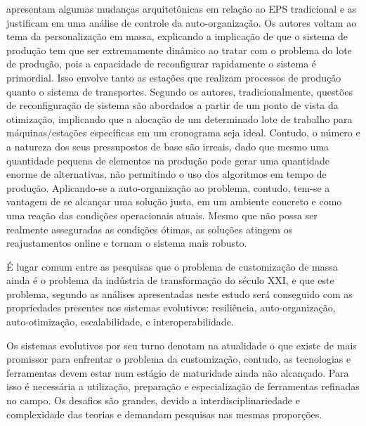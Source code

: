 \cite{ROCHA2014} apresentam algumas mudanças arquitetônicas em relação ao EPS tradicional e as justificam em uma análise de controle da auto-organização. Os autores voltam ao tema da personalização em massa, explicando a implicação de que o sistema de produção tem que ser extremamente dinâmico ao tratar com o problema do lote de produção, pois a capacidade de reconfigurar rapidamente o sistema é primordial. Isso envolve tanto as estações que realizam processos de produção quanto o sistema de transportes. Segundo os autores, tradicionalmente, questões de reconfiguração de sistema são abordados a partir de um ponto de vista da otimização, implicando que a alocação de um determinado lote de trabalho para máquinas/estações específicas em um cronograma seja ideal. Contudo, o número e a natureza dos seus pressupostos de base são irreais, dado que mesmo uma quantidade pequena de elementos na produção pode gerar uma quantidade enorme de alternativas, não permitindo o uso dos algoritmos em tempo de produção. Aplicando-se a auto-organização ao problema, contudo, tem-se a vantagem de se alcançar uma solução justa, em um ambiente concreto e como uma reação das condições operacionais atuais. Mesmo que não possa ser realmente asseguradas as condições ótimas, as soluções atingem os reajustamentos online e tornam o sistema mais robusto.

É lugar comum entre as pesquisas que o problema de customização de massa ainda é o problema da indústria de transformação do século XXI, e que este problema, segundo as análises apresentadas neste estudo será conseguido com as propriedades presentes nos sistemas evolutivos: resiliência, auto-organização, auto-otimização, escalabilidade, e interoperabilidade.

Os sistemas evolutivos por seu turno denotam na atualidade o que existe de mais promissor para enfrentar o problema da customização, contudo, as tecnologias e ferramentas devem estar num estágio de maturidade ainda não alcançado. Para isso é necessária a utilização, preparação e especialização de ferramentas refinadas no campo. Os desafios são grandes, devido a interdisciplinariedade e complexidade das teorias e demandam pesquisas nas mesmas proporções.



